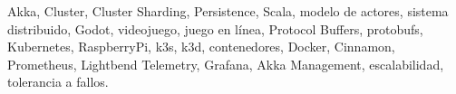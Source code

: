 \noindent Akka, Cluster, Cluster Sharding, Persistence, Scala, modelo de actores, sistema distribuido, Godot, videojuego, juego en línea, Protocol Buffers, protobufs,
Kubernetes, RaspberryPi, k3s, k3d, contenedores, Docker, Cinnamon, Prometheus, Lightbend Telemetry, Grafana, Akka Management, escalabilidad, tolerancia a fallos.
